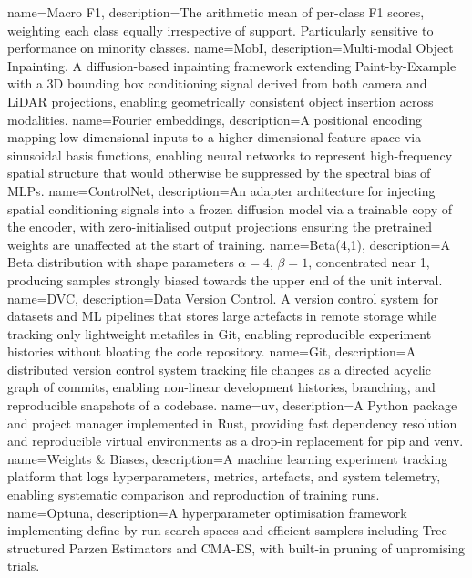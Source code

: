{
    name={Macro F1},
    description={The arithmetic mean of per-class F1 scores, weighting each class equally irrespective of support. Particularly sensitive to performance on minority classes.}
}
{
    name={MobI},
    description={Multi-modal Object Inpainting. A diffusion-based inpainting framework extending Paint-by-Example with a 3D bounding box conditioning signal derived from both camera and LiDAR projections, enabling geometrically consistent object insertion across modalities.}
}
{
    name={Fourier embeddings},
    description={A positional encoding mapping low-dimensional inputs to a higher-dimensional feature space via sinusoidal basis functions, enabling neural networks to represent high-frequency spatial structure that would otherwise be suppressed by the spectral bias of MLPs.}
}
{
    name={ControlNet},
    description={An adapter architecture for injecting spatial conditioning signals into a frozen diffusion model via a trainable copy of the encoder, with zero-initialised output projections ensuring the pretrained weights are unaffected at the start of training.}
}
{
    name={Beta(4,1)},
    description={A Beta distribution with shape parameters $\alpha=4$, $\beta=1$, concentrated near 1, producing samples strongly biased towards the upper end of the unit interval.}
}
{
    name={DVC},
    description={Data Version Control. A version control system for datasets and ML pipelines that stores large artefacts in remote storage while tracking only lightweight metafiles in Git, enabling reproducible experiment histories without bloating the code repository.}
}
{
    name={Git},
    description={A distributed version control system tracking file changes as a directed acyclic graph of commits, enabling non-linear development histories, branching, and reproducible snapshots of a codebase.}
}
{
    name={uv},
    description={A Python package and project manager implemented in Rust, providing fast dependency resolution and reproducible virtual environments as a drop-in replacement for pip and venv.}
}
{
    name={Weights \& Biases},
    description={A machine learning experiment tracking platform that logs hyperparameters, metrics, artefacts, and system telemetry, enabling systematic comparison and reproduction of training runs.}
}
{
    name={Optuna},
    description={A hyperparameter optimisation framework implementing define-by-run search spaces and efficient samplers including Tree-structured Parzen Estimators and CMA-ES, with built-in pruning of unpromising trials.}
}
